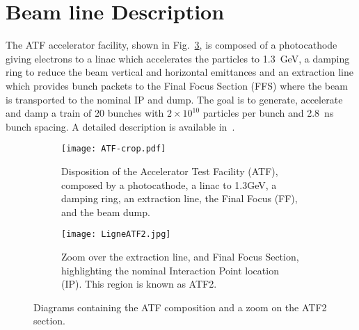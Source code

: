 {{\section{Beam line Description}
The ATF accelerator facility, shown in Fig.~\ref{f:ATF}, is composed of a photocathode giving electrons to a linac which accelerates the particles to 1.3~GeV, a damping ring to reduce the beam vertical and horizontal emittances and an extraction line which provides bunch packets to the Final Focus Section (FFS) where the beam is transported to the nominal IP and dump. The goal is to generate, accelerate and damp a train of 20 bunches with $2\times10^{10}$ particles per bunch and 2.8~ns bunch spacing. A detailed description is available in~\cite{ATF2prop,Alabau,Yves}.\par
\begin{figure}[htb]
\centering
\begin{subfigure}[b]{1.0\textwidth}
\texttt{[image: ATF-crop.pdf]}\caption{Disposition of the Accelerator Test Facility (ATF), composed by a photocathode, a linac to 1.3GeV, a damping ring, an extraction line, the Final Focus (FF), and the beam dump.}\label{f:ATF_ATF2}
\end{subfigure}
\begin{subfigure}[b]{1.0\textwidth}
\texttt{[image: LigneATF2.jpg]}\caption{Zoom over the extraction line, and Final Focus Section, highlighting the nominal Interaction Point location (IP). This region is known as ATF2.}\label{f:ATF2layout}
\end{subfigure}\caption{Diagrams containing the ATF composition and a zoom on the ATF2 section.}\label{f:ATF}
\end{figure}
}}
